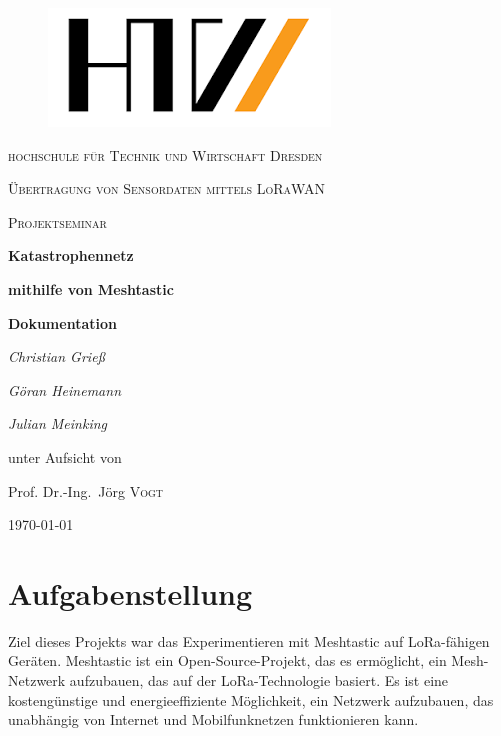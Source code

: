 \documentclass[12pt,a4paper]{article}
\author{Christian Grieß}
\begin{document}
\begin{titlepage}
\begin{figure}
	\centering \includegraphics[scale=1]{HTW_LOGO.png}
\end{figure}

	
	\centering
	{\scshape\LARGE hochschule für Technik und Wirtschaft Dresden \par}
	\vspace{2cm}
	{\scshape\Large Übertragung von Sensordaten mittels LoRaWAN\par}
	\vspace{0cm}
	{\scshape\Large Projektseminar \par}
	\vspace{1.5cm}
	{\huge\bfseries Katastrophennetz\par}
	{\huge\bfseries mithilfe von Meshtastic\par}
	\vspace{1.5cm}
	{\huge\bfseries {Dokumentation}\par}	
	\vspace{4cm}
	{\Large\itshape Christian Grieß\par}
	{\Large\itshape Göran Heinemann\par}
	{\Large\itshape Julian Meinking\par}
	\vfill
	unter Aufsicht von\par
	Prof. Dr.-Ing.~Jörg \textsc{Vogt}

	\vfill

	{\large \today\par}
\end{titlepage}
\newpage
\tableofcontents

\newpage
\section{Aufgabenstellung}

Ziel dieses Projekts war das Experimentieren mit Meshtastic auf LoRa-fähigen Geräten.
Meshtastic ist ein Open-Source-Projekt, das es ermöglicht, ein Mesh-Netzwerk aufzubauen, das auf der LoRa-Technologie basiert. Es ist eine kostengünstige und energieeffiziente Möglichkeit, ein Netzwerk aufzubauen, das unabhängig von Internet und Mobilfunknetzen funktionieren kann.
\end{document}

